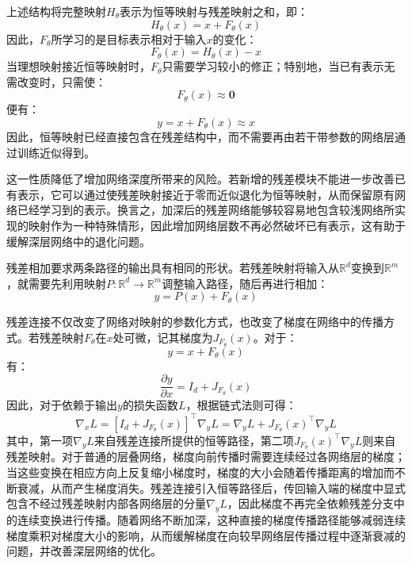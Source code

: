 上述结构将完整映射$H_\theta$表示为恒等映射与残差映射之和，即：
\begin{equation*}
	H_\theta(x)=x+F_\theta(x)
\end{equation*}
因此，$F_\theta$所学习的是目标表示相对于输入$x$的变化：
\begin{equation*}
	F_\theta(x)=H_\theta(x)-x
\end{equation*}
当理想映射接近恒等映射时，$F_\theta$只需要学习较小的修正；特别地，当已有表示无需改变时，只需使：
\begin{equation*}
	F_\theta(x)\approx\mathbf{0}
\end{equation*}
便有：
\begin{equation*}
	y=x+F_\theta(x)\approx x
\end{equation*}
因此，恒等映射已经直接包含在残差结构中，而不需要再由若干带参数的网络层通过训练近似得到。\par
这一性质降低了增加网络深度所带来的风险。若新增的残差模块不能进一步改善已有表示，它可以通过使残差映射接近于零而近似退化为恒等映射，从而保留原有网络已经学习到的表示。换言之，加深后的残差网络能够较容易地包含较浅网络所实现的映射作为一种特殊情形，因此增加网络层数不再必然破坏已有表示，这有助于缓解深层网络中的退化问题。
\begin{note}
	残差相加要求两条路径的输出具有相同的形状。若残差映射将输入从$\mathbb{R}^d$变换到$\mathbb{R}^m$，就需要先利用映射$P:\mathbb{R}^d\to\mathbb{R}^m$调整输入路径，随后再进行相加：
	\begin{equation*}
		y=P(x)+F_\theta(x)
	\end{equation*}\par
	残差连接不仅改变了网络对映射的参数化方式，也改变了梯度在网络中的传播方式。若残差映射$F_\theta$在$x$处可微，记其梯度为$J_{F_\theta}(x)$。对于：
	\begin{equation*}
		y=x+F_\theta(x)
	\end{equation*}
	有：
	\begin{equation*}
		\frac{\partial y}{\partial x}=I_d+J_{F_\theta}(x)
	\end{equation*}
	因此，对于依赖于输出$y$的损失函数$L$，根据链式法则可得：
	\begin{equation*}
		\nabla_xL=\left[I_d+J_{F_\theta}(x)\right]^{\top}\nabla_yL=\nabla_yL+J_{F_\theta}(x)^{\top}\nabla_yL
	\end{equation*}
	其中，第一项$\nabla_yL$来自残差连接所提供的恒等路径，第二项$J_{F_\theta}(x)^{\top}\nabla_yL$则来自残差映射。对于普通的层叠网络，梯度向前传播时需要连续经过各网络层的梯度；当这些变换在相应方向上反复缩小梯度时，梯度的大小会随着传播距离的增加而不断衰减，从而产生梯度消失。残差连接引入恒等路径后，传回输入端的梯度中显式包含不经过残差映射内部各网络层的分量$\nabla_yL$，因此梯度不再完全依赖残差分支中的连续变换进行传播。随着网络不断加深，这种直接的梯度传播路径能够减弱连续梯度乘积对梯度大小的影响，从而缓解梯度在向较早网络层传播过程中逐渐衰减的问题，并改善深层网络的优化。
\end{note}
